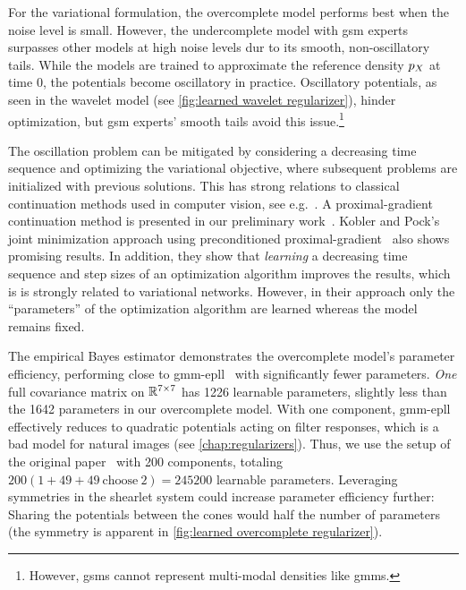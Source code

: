 For the variational formulation, the overcomplete model performs best when the noise level is small.
However, the undercomplete model with \gls{gsm} experts surpasses other models at high noise levels dur to its smooth, non-oscillatory tails.
While the models are trained to approximate the reference density \( p_X \) at time \num{0}, the potentials become oscillatory in practice.
Oscillatory potentials, as seen in the wavelet model (see \cref{fig:learned wavelet regularizer}), hinder optimization, but \gls{gsm} experts' smooth tails avoid this issue.\footnote{
	However, \glspl{gsm} cannot represent multi-modal densities like \glspl{gmm}.
}

The oscillation problem can be mitigated by considering a decreasing time sequence and optimizing the variational objective, where subsequent problems are initialized with previous solutions.
This has strong relations to classical continuation methods used in computer vision, see e.g.~\cite{Witkin1987,Yuille1989}.
A proximal-gradient continuation method is presented in our preliminary work~\cite{zach_explicit_2023}.
Kobler and Pock's joint minimization approach using preconditioned proximal-gradient~\cite[figure 4]{kobler2023learning} also shows promising results.
In addition, they show that \emph{learning} a decreasing time sequence and step sizes of an optimization algorithm improves the results, which is is strongly related to variational networks.
However, in their approach only the \enquote{parameters} of the optimization algorithm are learned whereas the model remains fixed.

The empirical Bayes estimator demonstrates the overcomplete model's parameter efficiency, performing close to \gls{gmm}-\gls{epll}~\cite{zoran_learning_2011} with significantly fewer parameters.
\emph{One} full covariance matrix on \( \R^{\numproduct{7x7}} \) has \num{1226} learnable parameters, slightly less than the \num{1642} parameters in our overcomplete model.
With one component, \gls{gmm}-\gls{epll} effectively reduces to quadratic potentials acting on filter responses, which is a bad model for natural images (see \cref{chap:regularizers}).
Thus, we use the setup of the original paper~\cite{zoran_learning_2011} with \num{200} components, totaling \( \num{200} (\num{1} + \num{49} + \num{49}\ \text{choose}\ \num{2}) = \num{245200} \) learnable parameters.
Leveraging symmetries in the shearlet system could increase parameter efficiency further:
Sharing the potentials between the cones would half the number of parameters (the symmetry is apparent in \cref{fig:learned overcomplete regularizer}).

